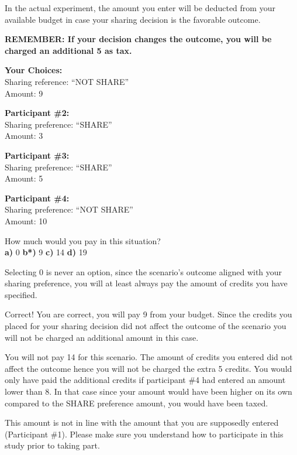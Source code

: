 In the actual experiment, the amount you enter will be deducted from your available budget in case your sharing decision is the favorable outcome.

\textbf{REMEMBER:  If your decision changes the outcome, you will be charged an additional 5 as tax.}

\textbf{Your Choices:} \\
\indent \indent Sharing reference: 	``NOT SHARE'' \\
\indent \indent Amount:		9 

\textbf{Participant \#2:} \\ 
\indent \indent Sharing preference:	``SHARE'' \\
\indent \indent Amount: 		3

\textbf{Participant \#3:} \\
\indent \indent Sharing preference:	``SHARE'' \\
\indent \indent Amount: 		5

\textbf{Participant \#4:} \\
\indent \indent Sharing preference:	``NOT SHARE'' \\
\indent \indent Amount: 		10  

How much would you pay in this situation? \\
\indent \textbf{a)} 0 \indent \indent \textbf{b*)} 9
\indent \indent \textbf{c)} 14
\indent \indent \textbf{d)} 19

 Selecting 0 is never an option, since the scenario's outcome aligned with your sharing preference, you will at least always pay the amount of credits you have specified.

 Correct! You are correct, you will pay 9 from your budget. Since the credits you placed for your sharing decision did not affect the outcome of the scenario you will not be charged an additional amount in this case.

 You will not pay 14 for this scenario. The amount of credits you entered did not affect the outcome hence you will not be charged the extra 5 credits. You would only have paid the additional credits if participant \#4 had entered an amount lower than 8. In that case since your amount would have been higher on its own compared to the SHARE preference amount, you would have been taxed.

\clearpage
{} This amount is not in line with the amount that you are supposedly entered (Participant \#1). Please make sure you understand how to participate in this study prior to taking part.


